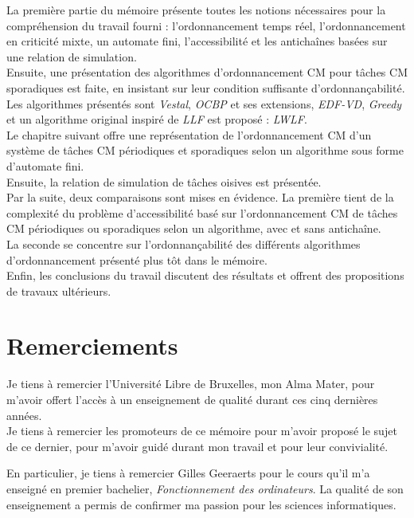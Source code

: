 \documentclass[12pt,a4paper,oneside]{book}
\theoremstyle{break}
\theoremstyle{breakplain}
\begin{document}
La première partie du mémoire présente toutes les notions nécessaires pour la compréhension du travail fourni : l'ordonnancement temps réel, l'ordonnancement en criticité mixte, un automate fini, l'accessibilité et les antichaînes basées sur une relation de simulation.\\

Ensuite, une présentation des algorithmes d'ordonnancement CM pour tâches CM sporadiques est faite, en insistant sur leur condition suffisante d'ordonnançabilité. Les algorithmes présentés sont \textit{Vestal}, \textit{OCBP} et ses extensions, \textit{EDF-VD}, \textit{Greedy} et un algorithme original inspiré de \textit{LLF} est proposé : \textit{LWLF}.\\

Le chapitre suivant offre une représentation de l'ordonnancement CM d'un système de tâches CM périodiques et sporadiques selon un algorithme sous forme d'automate fini.\\
Ensuite, la relation de simulation de tâches oisives est présentée.\\

Par la suite, deux comparaisons sont mises en évidence. La première tient de la complexité du problème d'accessibilité basé sur l'ordonnancement CM de tâches CM périodiques ou sporadiques selon un algorithme, avec et sans antichaîne.\\
La seconde se concentre sur l'ordonnançabilité des différents algorithmes d'ordonnancement présenté plus tôt dans le mémoire.\\

Enfin, les conclusions du travail discutent des résultats et offrent des propositions de travaux ultérieurs.


\chapter*{Remerciements}
Je tiens à remercier l'Université Libre de Bruxelles, mon Alma Mater, pour m'avoir offert l'accès à un enseignement de qualité durant ces cinq dernières années.\\

Je tiens à remercier les promoteurs de ce mémoire pour m'avoir proposé le sujet de ce dernier, pour m'avoir guidé durant mon travail et pour leur convivialité.

En particulier, je tiens à remercier Gilles Geeraerts pour le cours qu'il m'a enseigné en premier bachelier, \textit{Fonctionnement des ordinateurs}. La qualité de son enseignement a permis de confirmer ma passion pour les sciences informatiques.
\end{document}
